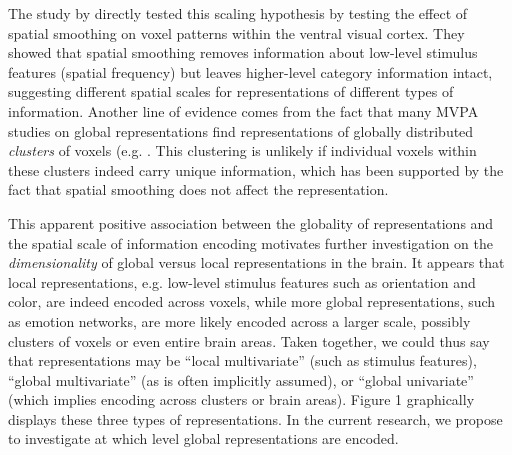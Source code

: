 \documentclass[12pt,a4paper]{article}\usepackage[]{graphicx}\usepackage[]{color}
\begin{document}
The study by \cite{brants2011} directly tested this scaling hypothesis by testing the effect of spatial smoothing on voxel patterns within the ventral visual cortex. They showed that spatial smoothing removes information about low-level stimulus features (spatial frequency) but leaves higher-level category information intact, suggesting different spatial scales for representations of different types of information. Another line of evidence comes from the fact that many MVPA studies on global representations find representations of globally distributed \emph{clusters} of voxels (e.g. \citealp{oosterwijk2015,kassam2013,corradi2014}. This clustering is unlikely if individual voxels within these clusters indeed carry unique information, which has been supported by the fact that spatial smoothing \citep{oosterwijk2015,kassam2013} does not affect the representation.

This apparent positive association between the globality of representations and the spatial scale of information encoding motivates further investigation on the \emph{dimensionality} of global versus local representations in the brain. It appears that local representations, e.g. low-level stimulus features such as orientation and color, are indeed encoded across voxels, while more global representations, such as emotion networks, are more likely encoded across a larger scale, possibly clusters of voxels or even entire brain areas. Taken together, we could thus say that representations may be ``local multivariate'' (such as stimulus features), ``global multivariate'' (as is often implicitly assumed), or ``global univariate'' (which implies encoding across clusters or brain areas). Figure 1 graphically displays these three types of representations. In the current research, we propose to investigate at which level global representations are encoded.
\end{document}
